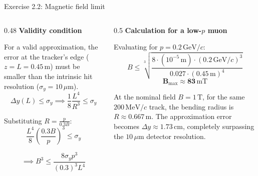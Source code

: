 \begin{frame}{Exercise 2.2: Magnetic field limit}
    \begin{columns}[T]
        
        \begin{column}{0.48\textwidth}
            \textbf{Validity condition}
            
            \small
            For a valid approximation, the error at the tracker's edge ($z = L = 0.45\,\mathrm{m}$) must be smaller than the intrinsic hit resolution ($\sigma_y = 10\,\mu\mathrm{m}$).
            \vspace{-0.5cm}
            $$ \Delta y(L) \leq \sigma_y \implies \frac{1}{8} \frac{L^4}{R^3} \leq \sigma_y $$
            
            Substituting  $R = \frac{p}{0.3 B}$:
            $$ \frac{L^4}{8} \left(\frac{0.3 B}{p}\right)^3 \leq \sigma_y $$
            
            $$ \implies B^3 \leq \frac{8 \sigma_y p^3}{(0.3)^3 L^4} $$
        \end{column}
        
        \begin{column}{0.5\textwidth}
            \textbf{Calculation for a low-$p$ muon}
            
            \small
            Evaluating for $p = 0.2\,\mathrm{GeV}/c$:
            $$ B \leq\sqrt[3]{ \frac{8 \cdot (10^{-5}\,\mathrm{m}) \cdot (0.2\,\mathrm{GeV}/c)^3}{0.027 \cdot (0.45\,\mathrm{m})^4}} $$
            $$ \mathbf{B_{\mathrm{max}} \approx 83\,\mathrm{mT}} $$
            
            \small 
            At the nominal field $B = 1\,\mathrm{T}$, for the same $200\,\mathrm{MeV}/c$ track, the bending radius is $R \approx 0.667\,\mathrm{m}$. The approximation error becomes $\Delta y \approx 1.73\,\mathrm{cm}$, completely surpassing the $10\,\mu\mathrm{m}$ detector resolution.
        \end{column}
        
    \end{columns}
\end{frame}

